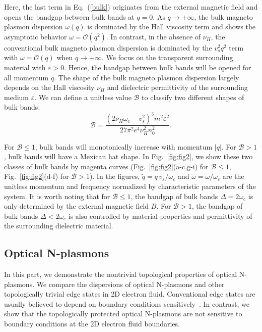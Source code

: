 \documentclass[%
reprint,
amsmath,amssymb,
aps,superscriptaddress
]{revtex4-2}
\begin{document}
Here, the last term in Eq.~(\ref{bulk}) originates from the external magnetic field and opens the bandgap between bulk bands at $q=0$. As $q\rightarrow + \infty$, the bulk magneto plasmon dispersion $\omega(q)$ is dominated by the Hall viscosity term and shows the asymptotic behavior $\omega=\mathcal{O}(q^2)$. In contrast, in the absence of $\nu_H$, the conventional bulk magneto plasmon dispersion is dominated by the $v_s^2 q^2$ term with $\omega=\mathcal{O}(q)$ when $q\rightarrow + \infty$. We focus on the transparent surrounding material with $\varepsilon>0$. Hence, the bandgap between bulk bands will be opened for all momentum $q$. The shape of the bulk magneto plasmon dispersion largely depends on the Hall viscosity $\nu_H$ and dielectric permittivity of the surrounding medium $\varepsilon$. We can define a unitless value $\mathcal{B}$ to classify two different shapes of bulk bands:
\begin{equation}
    \mathcal{B}=\frac{(2 \nu_H \omega_c - v_s^2)^3 m^2 \varepsilon^2 }{27 \pi^2 e^4 \nu_H^2 n_0^2}.
\end{equation}

For $\mathcal{B} \leqslant 1$, bulk bands will monotonically increase with momentum $|q|$. For $\mathcal{B}>1$, bulk bands will have a Mexican hat shape. In Fig.~\ref{fig:fig2}, we show these two classes of bulk bands by magenta curves (Fig.~\ref{fig:fig2}(a-c,g-i) for $\mathcal{B} \leqslant 1$, Fig.~\ref{fig:fig2}(d-f) for $\mathcal{B} > 1$). In the figures, $\tilde{q}=q \, v_s/\omega_c$ and $\tilde{\omega}=\omega/\omega_c$ are the unitless momentum and frequency normalized by characteristic parameters of the system. It is worth noting that for $\mathcal{B} \leqslant 1$, the bandgap of bulk bands $\Delta=2\omega_c$ is only determined by the external magnetic field $B$. For $\mathcal{B}>1$, the bandgap of bulk bands $\Delta<2\omega_c$ is also controlled by material properties and permittivity of the surrounding dielectric material.

\subsection{Optical N-plasmons}

In this part, we demonstrate the nontrivial topological properties of optical N-plasmons. We compare the dispersions of optical N-plasmons and other topologically trivial edge states in 2D electron fluid. Conventional edge states are usually believed to depend on boundary conditions sensitively~\cite{kiselev2019boundary}. In contrast, we show that the topologically protected optical N-plasmons are not sensitive to boundary conditions at the 2D electron fluid boundaries.
\end{document}
